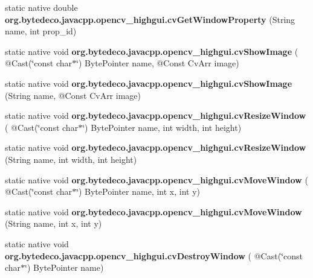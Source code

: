 \begin{DoxyCompactItemize}
\item 
\mbox{\label{group__highgui__c_gacfdefe386b405408323d01c92ebb90a6}} 
static native double {\bfseries org.\+bytedeco.\+javacpp.\+opencv\+\_\+highgui.\+cv\+Get\+Window\+Property} (String name, int prop\+\_\+id)
\item 
\mbox{\label{group__highgui__c_ga09279340507918074e41f539244bf578}} 
static native void {\bfseries org.\+bytedeco.\+javacpp.\+opencv\+\_\+highgui.\+cv\+Show\+Image} ( @Cast(\char`\"{}const char$\ast$\char`\"{}) Byte\+Pointer name, @Const Cv\+Arr image)
\item 
\mbox{\label{group__highgui__c_ga523b94e9b014309d5a4a85142821a724}} 
static native void {\bfseries org.\+bytedeco.\+javacpp.\+opencv\+\_\+highgui.\+cv\+Show\+Image} (String name, @Const Cv\+Arr image)
\item 
\mbox{\label{group__highgui__c_gac8c7bf9e69830df0cdab9ff368ebae48}} 
static native void {\bfseries org.\+bytedeco.\+javacpp.\+opencv\+\_\+highgui.\+cv\+Resize\+Window} ( @Cast(\char`\"{}const char$\ast$\char`\"{}) Byte\+Pointer name, int width, int height)
\item 
\mbox{\label{group__highgui__c_ga83f284ba56e9c645b54ef20c12725aa2}} 
static native void {\bfseries org.\+bytedeco.\+javacpp.\+opencv\+\_\+highgui.\+cv\+Resize\+Window} (String name, int width, int height)
\item 
\mbox{\label{group__highgui__c_ga47462bba491616257b9a7809c233bfe6}} 
static native void {\bfseries org.\+bytedeco.\+javacpp.\+opencv\+\_\+highgui.\+cv\+Move\+Window} ( @Cast(\char`\"{}const char$\ast$\char`\"{}) Byte\+Pointer name, int x, int y)
\item 
\mbox{\label{group__highgui__c_ga6c8d69c38879bdf9c7e9ff8c8ab69bf4}} 
static native void {\bfseries org.\+bytedeco.\+javacpp.\+opencv\+\_\+highgui.\+cv\+Move\+Window} (String name, int x, int y)
\item 
\mbox{\label{group__highgui__c_gaeafd40912f8ca3ea46329219a70add44}} 
static native void {\bfseries org.\+bytedeco.\+javacpp.\+opencv\+\_\+highgui.\+cv\+Destroy\+Window} ( @Cast(\char`\"{}const char$\ast$\char`\"{}) Byte\+Pointer name)

\end{DoxyCompactItemize}
